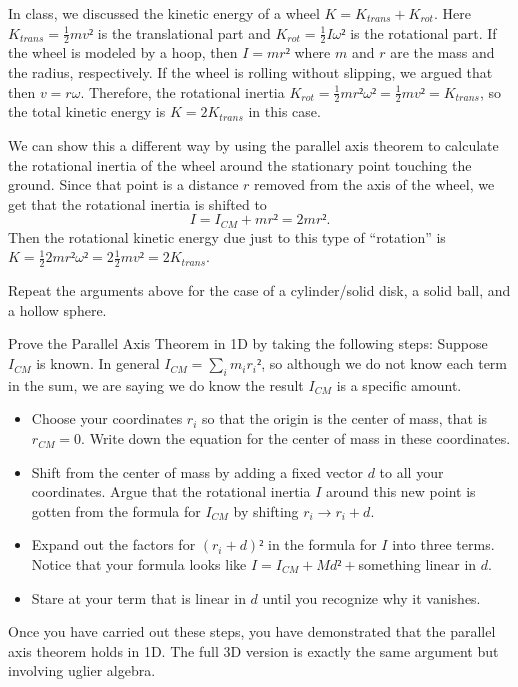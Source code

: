 \begin{example}
In class, we discussed the kinetic energy of a wheel $K = K_{trans}+K_{rot}$. Here $K_{trans}= \frac12 mv²$ is the translational part and $K_{rot} = \frac12 I ω²$ is the rotational part. If the wheel is modeled by a hoop, then $I=mr²$ where $m$ and $r$ are the mass and the radius, respectively. 
If the wheel is rolling without slipping, we argued that then $v=rω$. Therefore, the rotational inertia $K_{rot} =\frac12 mr² ω² = \frac12 mv² =K_{trans}$, so the total kinetic energy is $K=2K_{trans}$ in this case. 

We can show this a different way by using the parallel axis theorem to calculate the rotational inertia of the wheel around the stationary point touching the ground. Since that point is a distance $r$ removed from the axis of the wheel, we get that the rotational inertia is shifted to 
$$
I = I_{CM}+mr² = 2 mr². 
$$
Then the rotational kinetic energy due just to this type of “rotation” is $K=\frac12 2mr² ω² =2 \frac12 mv² = 2K_{trans}$.
\end{example}

\begin{exercise}
Repeat the arguments above for the case of a cylinder/solid disk, a solid ball, and a hollow sphere. 
\end{exercise}

\begin{exercise}
Prove the Parallel Axis Theorem in 1D by taking the following steps: Suppose $I_{CM}$ is known. In general $I_{CM} = ∑_i m_i r_i²$, so although we do not know each term in the sum, we are saying we do know the result $I_{CM}$ is a specific amount.
\begin{itemize}
	\item Choose your coordinates $r_i$ so that the origin is the center of mass, that is $r_{CM}=0$. Write down the equation for the center of mass in these coordinates. 
	\item Shift from the center of mass by adding a fixed vector $d$ to all your coordinates. Argue that the rotational inertia $I$ around this new point is gotten from the formula for $I_{CM}$ by shifting $r_i → r_i +d$. 
	\item Expand out the factors for $(r_i+d)²$ in the formula for $I$ into three terms. Notice that your formula looks like $I=I_{CM} +Md²+$something linear in $d$. 
	\item Stare at your term that is linear in $d$ until you recognize why it vanishes. 
\end{itemize}
Once you have carried out these steps, you have demonstrated that the parallel axis theorem holds in 1D. The full 3D version is exactly the same argument but involving uglier algebra. 
\end{exercise}


